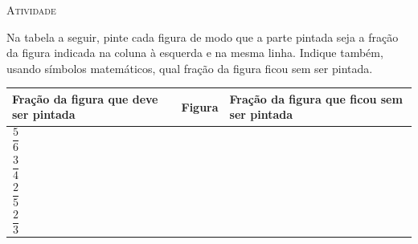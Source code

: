 \documentclass[10 pt,usenames,dvipsnames, oneside]{article}
\begin{document}
\medskip
\begin{center}
{\large \scshape Atividade}
\end{center}
\fi\setlength\baselineskip{.7em}

Na tabela a seguir, pinte cada figura de modo que a parte pintada seja a fração da figura indicada na coluna à esquerda e na mesma linha. Indique também, usando símbolos matemáticos, qual fração da figura ficou sem ser pintada.

\begin{center}
  \begin{longtable}{|m{}|c|m{}|}
    \hline
      Fração da figura que deve ser pintada  & \parbox[c]{1.6cm}{\centering Figura}  &   Fração da figura que ficou sem ser pintada  \\
    \hline
    \endhead
     \centering $\dfrac{5}{6}$  & \centering \parbox[c][1.75cm][c]{1.6cm}{}
&  \\
    \hline
     \centering $\dfrac{3}{4}$  &  \centering \parbox[c][1.75cm][c]{1.6cm}{}
                                   &  \\
    \hline
     \centering $\dfrac{2}{5}$  &   \centering \parbox[c][1.75cm][c]{2.4cm}{
                                     }
                                   &  \\
    \hline
     \centering $\dfrac{2}{3}$  &  \centering \parbox[c][1.75cm][c]{1.6cm}{}

\end{longtable}
\end{center}
\end{document}
